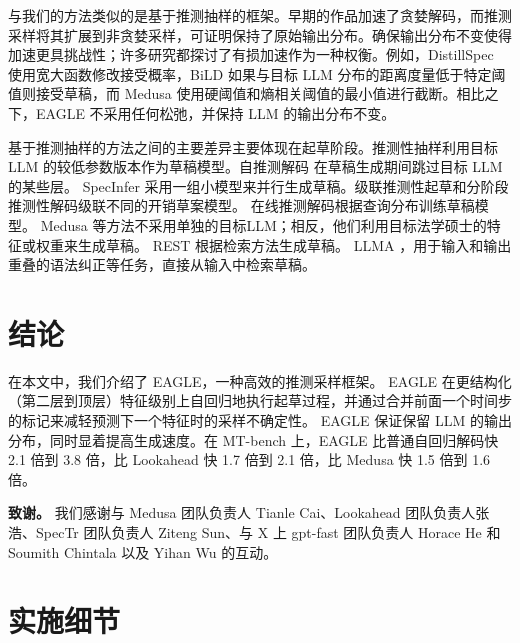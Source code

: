 \documentclass{article}
\theoremstyle{plain}
\theoremstyle{definition}
\theoremstyle{remark}
\begin{document}
与我们的方法类似的是基于推测抽样的框架。早期的作品\cite{stern2018blockwise,sun2021instantaneous}加速了贪婪解码，而推测采样\cite{leviathan2023fast,chen2023accelerating}将其扩展到非贪婪采样，可证明保持了原始输出分布。确保输出分布不变使得加速更具挑战性；许多研究都探讨了有损加速作为一种权衡。例如，DistillSpec \cite{zhou2023distillspec} 使用宽大函数修改接受概率，BiLD \cite{kim2023speculative} 如果与目标 LLM 分布的距离度量低于特定阈值则接受草稿，而 Medusa \cite{medusa} 使用硬阈值和熵相关阈值的最小值进行截断。相比之下，EAGLE 不采用任何松弛，并保持 LLM 的输出分布不变。

基于推测抽样的方法之间的主要差异主要体现在起草阶段。推测性抽样\cite{leviathan2023fast,chen2023accelerating}利用目标 LLM 的较低参数版本作为草稿模型。自推测解码 \cite{zhang2023draft} 在草稿生成期间跳过目标 LLM 的某些层。 SpecInfer \cite{miao2023specinfer} 采用一组小模型来并行生成草稿。级联推测性起草\cite{chen2023cascade}和分阶段推测性解码\cite{spector2023accelerating}级联不同的开销草案模型。 
在线推测解码\cite{liu2023online}根据查询分布训练草稿模型。
Medusa \cite{medusa}等方法\cite{hooper2023speed,fu2023lookahead,yang2023predictive}不采用单独的目标LLM；相反，他们利用目标法学硕士的特征或权重来生成草稿。 REST \cite{he2023rest} 根据检索方法生成草稿。
LLMA \cite{yang2023inference}，用于输入和输出重叠的语法纠正等任务，直接从输入中检索草稿。 



\section{结论}
在本文中，我们介绍了 EAGLE，一种高效的推测采样框架。 EAGLE 在更结构化（第二层到顶层）特征级别上自回归地执行起草过程，并通过合并前面一个时间步的标记来减轻预测下一个特征时的采样不确定性。 EAGLE 保证保留 LLM 的输出分布，同时显着提高生成速度。在 MT-bench 上，EAGLE 比普通自回归解码快 2.1 倍到 3.8 倍，比 Lookahead 快 1.7 倍到 2.1 倍，比 Medusa 快 1.5 倍到 1.6 倍。

\textbf{致谢。} 我们感谢与 Medusa 团队负责人 Tianle Cai、Lookahead 团队负责人张浩、SpecTr 团队负责人 Ziteng Sun、与 X 上 gpt-fast 团队负责人 Horace He 和 Soumith Chintala 以及 Yihan Wu 的互动。






\newpage
\appendix


\onecolumn
\section{实施细节}
\end{document}
